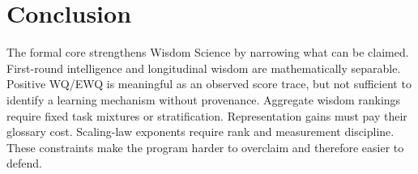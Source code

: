 \documentclass[11pt]{article}
\begin{document}
\section{Conclusion}

The formal core strengthens Wisdom Science by narrowing what can be claimed.
First-round intelligence and longitudinal wisdom are mathematically separable.
Positive WQ/EWQ is meaningful as an observed score trace, but not sufficient to identify a learning mechanism without provenance.
Aggregate wisdom rankings require fixed task mixtures or stratification.
Representation gains must pay their glossary cost.
Scaling-law exponents require rank and measurement discipline.
These constraints make the program harder to overclaim and therefore easier to defend.
\end{document}
